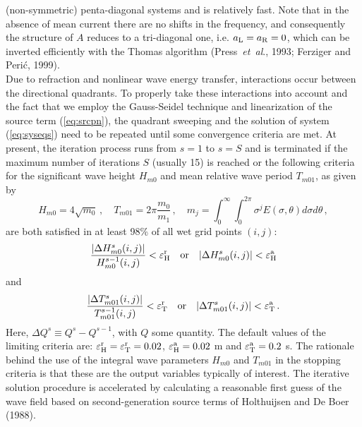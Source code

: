 \documentclass[12pt]{book}
\begin{document}
(non-symmetric) penta-diagonal systems and is relatively fast.
Note that in the absence of mean current there are no shifts
in the frequency, and consequently the structure of $A$ reduces to a tri-diagonal one, i.e.
$a_{\rm L} = a_{\rm R} = 0$, which can be inverted efficiently with
the Thomas algorithm (Press~{\it et~al}., 1993; Ferziger and Peri\'{c}, 1999).
\nocite{Fer99P}
\\[2ex]
\noindent
Due to refraction and nonlinear wave energy transfer, interactions occur
between the directional quadrants. To properly take these interactions into
account and the fact that we employ the Gauss-Seidel technique and linearization of the source term (\ref{eq:srcpn}),
the quadrant sweeping and the solution of system (\ref{eq:syseqs})
need to be repeated until some convergence criteria are met. At present,
the iteration process runs from $s = 1$ to $s = S$ and is terminated if the maximum number of
iterations $S$ (usually 15) is reached or the following criteria for the significant wave height $H_{m0}$ and mean
relative wave period $T_{m01}$, as given by
\begin{equation}
  H_{m0} = 4\sqrt{m_0}\, , \quad T_{m01} = 2\pi \frac{m_0}{m_1}\, , \quad
  m_j = \int_{0}^{\infty} \int_{0}^{2\pi} \sigma^j E(\sigma,\theta) d\sigma d\theta \, ,
\end{equation}
are both satisfied in at least 98\% of all wet grid points $(i,j)$:
\begin{equation}
  \frac{|\Delta H^{s}_{m0}(i,j)|}{H^{s-1}_{m0}(i,j)} <
  {\varepsilon}^{\rm r}_{\rm H} \quad \mbox{or} \quad
  |\Delta H^{s}_{m0}(i,j)| <
  {\varepsilon}^{\rm a}_{\rm H}
  \label{eq:stop}
\end{equation}
and
\begin{equation}
  \frac{|\Delta T^{s}_{m01}(i,j)|}{T^{s-1}_{m01}(i,j)} <
  {\varepsilon}^{\mathrm{r}}_{\mathrm{T}} \quad \mbox{or} \quad
  |\Delta T^{s}_{m01}(i,j)| <
  {\varepsilon}^{\rm a}_{\rm T} \, .
  \label{eq:stop2}
\end{equation}
Here, $\Delta Q^s \equiv Q^s - Q^{s-1}$, with $Q$ some quantity.
The default values of the limiting criteria are:
${\varepsilon}^{\rm r}_{\rm H} = {\varepsilon}^{\rm r}_{\rm T} = 0.02$,
${\varepsilon}^{\rm a}_{\rm H} = 0.02$ m and ${\varepsilon}^{\rm a}_{\rm T} = 0.2$ s.
The rationale behind the use of the integral wave parameters
$H_{m0}$ and $T_{m01}$ in the stopping criteria is that these are the output variables typically of interest.
The iterative solution procedure is accelerated by calculating a
reasonable first guess of the wave field based on second-generation source
terms of Holthuijsen and De Boer (1988).
\nocite{Hol88B}
\end{document}
